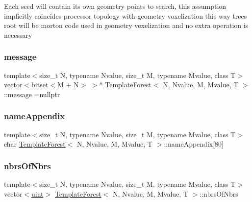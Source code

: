 Each seed will contain its own geometry points to search, this assumption implicitly coincides processor topology with geometry voxelization this way tree\textquotesingle{}s root will be morton code used in geometry voxelization and no extra operation is necessary \mbox{\label{classTemplateForest_a5ecc1b5d7c94ff6c9164a2c63bfa6101}} 
\subsubsection{\texorpdfstring{message}{message}}
{\footnotesize\ttfamily template$<$size\+\_\+t N, typename Nvalue, size\+\_\+t M, typename Mvalue, class T$>$ \\
vector$<$bitset$<$M + N$>$ $>$$\ast$ \mbox{\hyperlink{classTemplateForest}{Template\+Forest}}$<$ N, Nvalue, M, Mvalue, T $>$\+::message =nullptr\hspace{0.3cm}{\ttfamily [private]}}

\mbox{\label{classTemplateForest_a30c73b4c9e35b167e920dfe00af66b15}} 
\subsubsection{\texorpdfstring{name\+Appendix}{nameAppendix}}
{\footnotesize\ttfamily template$<$size\+\_\+t N, typename Nvalue, size\+\_\+t M, typename Mvalue, class T$>$ \\
char \mbox{\hyperlink{classTemplateForest}{Template\+Forest}}$<$ N, Nvalue, M, Mvalue, T $>$\+::name\+Appendix\mbox{[}80\mbox{]}\hspace{0.3cm}{\ttfamily [private]}}

\mbox{\label{classTemplateForest_a36aededebe33b6c43e713b9fa93e9a14}} 
\subsubsection{\texorpdfstring{nbrs\+Of\+Nbrs}{nbrsOfNbrs}}
{\footnotesize\ttfamily template$<$size\+\_\+t N, typename Nvalue, size\+\_\+t M, typename Mvalue, class T$>$ \\
vector$<$\mbox{\hyperlink{definitions_8h_a69aa29b598b851b0640aa225a9e5d61d}{uint}}$>$ \mbox{\hyperlink{classTemplateForest}{Template\+Forest}}$<$ N, Nvalue, M, Mvalue, T $>$\+::nbrs\+Of\+Nbrs\hspace{0.3cm}{\ttfamily [private]}}

